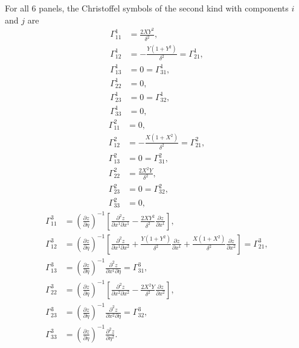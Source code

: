 \documentclass{article}
\begin{document}
For all 6 panels, the Christoffel symbols of the second kind with components $i$ and $j$ are
\begin{align}
\Gamma^1_{11}&=\frac{2 X Y^2 }{ \delta^2 }, \\
\Gamma^1_{12}&=-\frac{ Y(1 + Y^2) }{ \delta^2 }=\Gamma^1_{21}, \\
\Gamma^1_{13}&=0=\Gamma^1_{31}, \\
\Gamma^1_{22}&=0, \\
\Gamma^1_{23}&=0=\Gamma^1_{32}, \\
\Gamma^1_{33}&=0,
\end{align}
\begin{align}
\Gamma^2_{11}&=0, \\
\Gamma^2_{12}&=-\frac{X(1+X^2)}{\delta^2}=\Gamma^2_{21}, \\
\Gamma^2_{13}&=0=\Gamma^2_{31}, \\
\Gamma^2_{22}&=\frac{2X^2Y}{\delta^2}, \\
\Gamma^2_{23}&=0=\Gamma^2_{32}, \\
\Gamma^2_{33}&=0,
\end{align}
\begin{align}
\Gamma^3_{11}&=\left(\frac{\partial z}{\partial \eta}\right)^{-1}\left[ \frac{\partial^2 z}{\partial x^1 \partial x^1} - \frac{2 X Y^2 }{ \delta^2 } \frac{\partial z}{\partial x^1}\right], \\
\Gamma^3_{12}&=\left(\frac{\partial z}{\partial \eta}\right)^{-1}\left[ \frac{\partial^2 z}{\partial x^1 \partial x^2} + \frac{ Y(1 + Y^2) }{ \delta^2 } \frac{\partial z}{\partial x^1} + \frac{X(1+X^2)}{\delta^2} \frac{\partial z}{\partial x^2}   \right]=\Gamma^3_{21}, \\
\Gamma^3_{13}&=\left(\frac{\partial z}{\partial \eta}\right)^{-1} \frac{\partial^2 z}{\partial x^1 \partial \eta}=\Gamma^3_{31}, \\
\Gamma^3_{22}&=\left(\frac{\partial z}{\partial \eta}\right)^{-1}\left[ \frac{\partial^2 z}{\partial x^2 \partial x^2} - \frac{2 X^2 Y }{ \delta^2 } \frac{\partial z}{\partial x^2}\right], \\
\Gamma^3_{23}&=\left(\frac{\partial z}{\partial \eta}\right)^{-1} \frac{\partial^2 z}{\partial x^2 \partial \eta}=\Gamma^3_{32}, \\
\Gamma^3_{33}&=\left(\frac{\partial z}{\partial \eta}\right)^{-1} \frac{\partial^2 z}{\partial \eta^2}.
\end{align}
\end{document}
